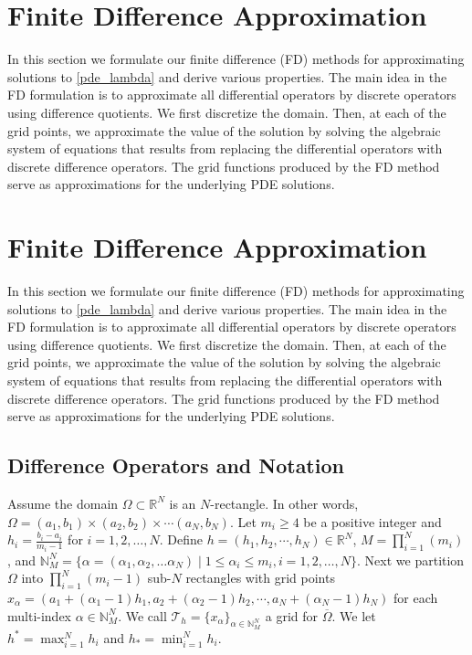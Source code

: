 \documentclass[12pt, reqno]{amsart}
\numberwithin{equation}{section}
\begin{document}
\section{Finite Difference Approximation}
\label{sec:FD}
In this section we formulate our finite difference (FD) methods for approximating solutions to \eqref{pde_lambda} and derive various properties.  
The main idea in the FD formulation is to approximate all differential operators by discrete operators using difference quotients. We first discretize the domain.  Then, at each of the grid points, we approximate the value of the solution by solving the algebraic system of equations that results from replacing the differential operators with discrete difference operators.
The grid functions produced by the FD method serve as approximations for the underlying PDE solutions.  

\section{Finite Difference Approximation}
\label{sec:FD}
In this section we formulate our finite difference (FD) methods for approximating solutions to \eqref{pde_lambda} and derive various properties.  
The main idea in the FD formulation is to approximate all differential operators by discrete operators using difference quotients. We first discretize the domain.  Then, at each of the grid points, we approximate the value of the solution by solving the algebraic system of equations that results from replacing the differential operators with discrete difference operators.
The grid functions produced by the FD method serve as approximations for the underlying PDE solutions.  

\subsection{Difference Operators and Notation}
\label{sec:FD_operators}
Assume the domain $\Omega \subset \mathbb{R}^N$ is an $N$-rectangle. In other words, $\Omega = (a_1,b_1)\times (a_2,b_2)\times \cdots (a_N,b_N)$. Let $m_i \geq 4$ be a positive integer and $h_i=\frac{b_i-a_i}{m_i-1}$ for $i=1,2,\ldots, N$. Define ${h}=(h_1,h_2,\cdots, h_N) \in \mathbb{R}^N$, $M=\prod_{i=1}^{N}(m_i)$, and $\mathbb{N}_M^N=\{{\alpha}=(\alpha_1,\alpha_2, \ldots \alpha_N)\mid 1\leq \alpha_i\leq m_i, i=1,2, \ldots, N\}$. Next we partition $\Omega$ into $\prod_{i=1}^N(m_i-1)$ sub-$N$ rectangles with grid points ${x_{\alpha}}=(a_1+(\alpha_1-1)h_1, a_2+(\alpha_2-1)h_2, \cdots, a_N+(\alpha_N-1)h_N)$ for each multi-index $\alpha \in \mathbb{N}_M^N$. We call $\mathcal{T}_{{h}}=\{{x}_{\alpha}\}_{\alpha \in \mathbb{N}_M^N}$ a grid for $\overline{\Omega}$.
We let $h^* = \max_{i=1}^N h_i$ and $h_* = \min_{i=1}^N h_i$. 
\end{document}
